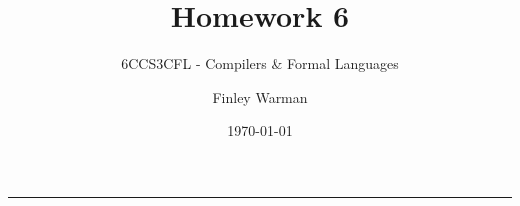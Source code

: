 \documentclass[english]{scrartcl}
\begin{document}


\subtitle{6CCS3CFL - Compilers \& Formal Languages}
\title{Homework 6}
\author{Finley Warman}
\date{\today}

\maketitle


\tableofcontents
\par\noindent\rule{\textwidth}{0.4pt}


\newpage


\end{document}
